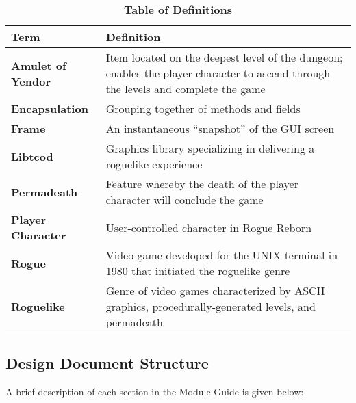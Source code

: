 \documentclass[12pt, titlepage]{article}
\begin{document}
        \begin{table}[H]
            \centering
            \caption{\textbf{Table of Definitions}}
            \label{TableDefinitions}
            \bigskip
            \def\arraystretch{1.5}
            \begin{tabularx}{\textwidth}{p{3.7cm}X}
                \toprule
                \textbf{Term} & \textbf{Definition}\\
                \midrule
                \textbf{Amulet of Yendor} & Item located on the deepest level of the dungeon; enables the player character to ascend through the levels and complete the game\\
                \textbf{Encapsulation} & Grouping together of methods and fields\\
                \textbf{Frame} & An instantaneous ``snapshot'' of the GUI screen\\
                \textbf{Libtcod} & Graphics library specializing in delivering a roguelike experience\\
                \textbf{Permadeath} & Feature whereby the death of the player character will conclude the game\\
                \textbf{Player Character} & User-controlled character in Rogue Reborn\\
                \textbf{Rogue} & Video game developed for the UNIX terminal in 1980 that initiated the roguelike genre\\
                \textbf{Roguelike} & Genre of video games characterized by ASCII graphics, procedurally-generated levels, and permadeath\\
                \bottomrule
            \end{tabularx}
        \end{table} 

    \newpage
    \subsection{Design Document Structure}
        A brief description of each section in the Module Guide is given below:
\end{document}
